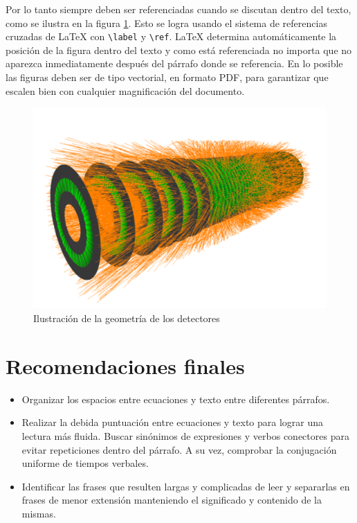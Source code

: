 \documentclass{article}
\begin{document}
Por lo tanto siempre deben ser referenciadas cuando se discutan dentro del texto, como se ilustra en la figura \ref{fig:detector}. Esto se logra usando el sistema de referencias cruzadas de \LaTeX{} con \verb|\label| y \verb|\ref|. \LaTeX{} determina automáticamente la posición de la figura dentro del texto y como está referenciada no importa que no aparezca inmediatamente después del párrafo donde se referencia. En lo posible las figuras deben ser de tipo vectorial, en formato PDF, para garantizar que escalen bien con cualquier magnificación del documento. 

\begin{figure}
    \centering
    \includegraphics[scale=0.2]{figures/cern_graphic}
    \caption{Ilustración de la geometría de los detectores}
    \label{fig:detector}
\end{figure}

\section{Recomendaciones finales}
\begin{itemize}
\item Organizar los espacios entre ecuaciones y texto entre diferentes párrafos.
\item Realizar la debida puntuación entre ecuaciones y
texto para lograr una lectura más fluida. Buscar sinónimos de expresiones
y verbos conectores para evitar repeticiones dentro del párrafo. A su vez, comprobar
la conjugación uniforme de tiempos verbales.
\item Identificar las frases que resulten largas y complicadas de
leer y separarlas en frases de menor extensión manteniendo el significado
y contenido de la mismas.
\end{itemize}
\end{document}
